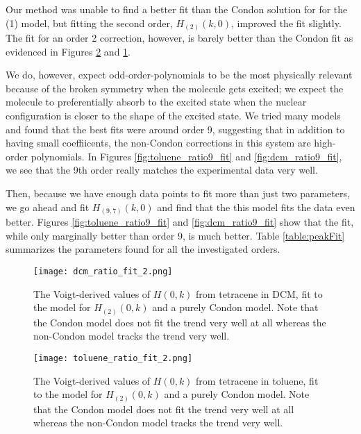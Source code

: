 Our method was unable to find a better fit than the Condon solution for for the (1) model, but fitting the second order, $H_{(2)}(k,0)$, improved the fit slightly.  The fit for an order 2 correction, however, is barely better than the Condon fit as evidenced in Figures \ref{fig:toluene_ratio2_fit} and \ref{fig:dcm_ratio2_fit}.

We do, however, expect odd-order-polynomials to be the most physically relevant because of the broken symmetry when the molecule gets excited; we expect the molecule to preferentially absorb to the excited state when the nuclear configuration is closer to the shape of the excited state.  We tried many models and found that the best fits were around order 9, suggesting that in addition to having small coeffiicents, the non-Condon corrections in this system are high-order polynomials.  In Figures \ref{fig:toluene_ratio9_fit} and \ref{fig:dcm_ratio9_fit}, we see that the 9th order really matches the experimental data very well.

Then, because we have enough data points to fit more than just two parameters, we go ahead and fit $H_{(9,7)}(k,0)$ and find that the this model fits the data even better. Figures \ref{fig:toluene_ratio9_fit} and \ref{fig:dcm_ratio9_fit} show that the fit, while only marginally better than order 9, is much better.  Table \ref{table:peakFit} summarizes the parameters found for all the investigated orders.



\begin{figure}
   \texttt{[image: dcm\_ratio\_fit\_2.png]}
   \caption{The Voigt-derived values of $H(0,k)$ from tetracene in DCM, fit to the model for $H_{(2)}(0,k)$ and a purely Condon model.  Note that the Condon model does not fit the trend very well at all whereas the non-Condon model tracks the trend very well.}
	\label{fig:dcm_ratio2_fit}
\end{figure}
\begin{figure}
   \texttt{[image: toluene\_ratio\_fit\_2.png]}
   \caption{The Voigt-derived values of $H(0,k)$ from tetracene in toluene, fit to the model for $H_{(2)}(0,k)$ and a purely Condon model.  Note that the Condon model does not fit the trend very well at all whereas the non-Condon model tracks the trend very well.}
	\label{fig:toluene_ratio2_fit}
\end{figure}



